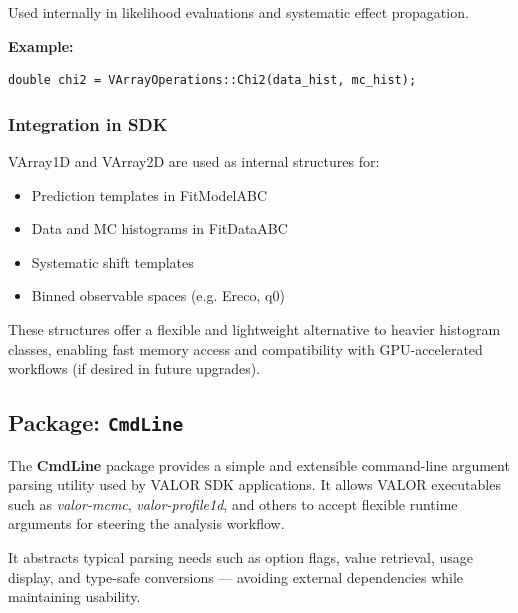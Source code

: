 Used internally in likelihood evaluations and systematic effect propagation.

\vspace{0.5em}
\noindent\textbf{Example:}

\begin{lstlisting}
double chi2 = VArrayOperations::Chi2(data_hist, mc_hist);
\end{lstlisting}

\vspace{1em}
\subsubsection*{Integration in SDK}

{\color{cadmiumgreen} VArray1D} and {\color{cadmiumgreen} VArray2D} are used as internal structures for:

\begin{itemize}
  \item Prediction templates in {\color{cadmiumgreen} FitModelABC}
  \item Data and MC histograms in {\color{cadmiumgreen} FitDataABC}
  \item Systematic shift templates
  \item Binned observable spaces (e.g. {\color{amber}Ereco}, {\color{amber}q0})
\end{itemize}

These structures offer a flexible and lightweight alternative to heavier histogram classes, enabling fast memory access and compatibility with GPU-accelerated workflows (if desired in future upgrades).

%
%
%

\subsection{Package: \texttt{CmdLine}}

The {\color{cadmiumgreen} \textbf{CmdLine}} package provides a simple and extensible command-line argument parsing utility used by VALOR SDK applications.  
It allows VALOR executables such as {\it valor-mcmc}, {\it valor-profile1d}, and others to accept flexible runtime arguments for steering the analysis workflow.

It abstracts typical parsing needs such as option flags, value retrieval, usage display, and type-safe conversions — avoiding external dependencies while maintaining usability.

\vspace{1em}
